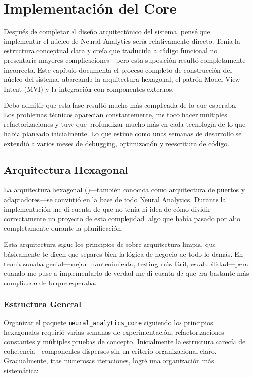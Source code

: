 \chapter{Implementación del Core}\label{ch:core_implementing}

Después de completar el diseño arquitectónico del sistema, pensé que implementar el núcleo de Neural Analytics sería relativamente directo. Tenía la estructura conceptual clara y creía que traducirla a código funcional no presentaría mayores complicaciones—pero esta suposición resultó completamente incorrecta. Este capítulo documenta el proceso completo de construcción del núcleo del sistema, abarcando la arquitectura hexagonal, el patrón Model-View-Intent (MVI) y la integración con componentes externos.

Debo admitir que esta fase resultó mucho más complicada de lo que esperaba. Los problemas técnicos aparecían constantemente, me tocó hacer múltiples refactorizaciones y tuve que profundizar mucho más en cada tecnología de lo que había planeado inicialmente. Lo que estimé como unas semanas de desarrollo se extendió a varios meses de debugging, optimización y reescritura de código.

\section{Arquitectura Hexagonal}

La arquitectura hexagonal (\citeyear{martin2017clean})—también conocida como arquitectura de puertos y adaptadores—se convirtió en la base de todo Neural Analytics. Durante la implementación me di cuenta de que no tenía ni idea de cómo dividir correctamente un proyecto de esta complejidad, algo que había pasado por alto completamente durante la planificación.

Esta arquitectura sigue los principios de  sobre arquitectura limpia, que básicamente te dicen que separes bien la lógica de negocio de todo lo demás. En teoría sonaba genial—mejor mantenimiento, testing más fácil, escalabilidad—pero cuando me puse a implementarlo de verdad me di cuenta de que era bastante más complicado de lo que esperaba.

\subsection{Estructura General}

Organizar el paquete \texttt{neural\_analytics\_core} siguiendo los principios hexagonales requirió varias semanas de experimentación, refactorizaciones constantes y múltiples pruebas de concepto. Inicialmente la estructura carecía de coherencia—componentes dispersos sin un criterio organizacional claro. Gradualmente, tras numerosas iteraciones, logré una organización más sistemática:

